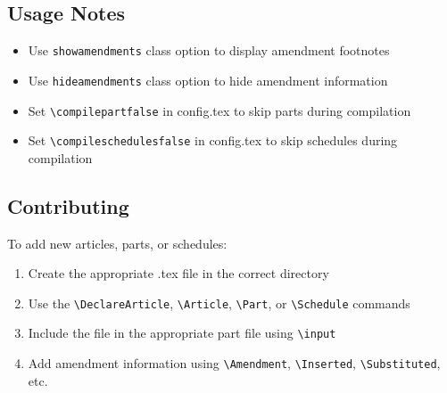 \documentclass[a4paper,12pt,showamendments]{soi}
\begin{document}
    \subsection*{Usage Notes}
    \begin{itemize}
    \item Use \texttt{showamendments} class option to display amendment footnotes
    \item Use \texttt{hideamendments} class option to hide amendment information
    \item Set \texttt{\textbackslash{}compilepartfalse} in config.tex to skip parts during compilation
    \item Set \texttt{\textbackslash{}compileschedulesfalse} in config.tex to skip schedules during compilation
    \end{itemize}
    
    \subsection*{Contributing}
    To add new articles, parts, or schedules:
    \begin{enumerate}
    \item Create the appropriate .tex file in the correct directory
    \item Use the \texttt{\textbackslash{}DeclareArticle}, \texttt{\textbackslash{}Article}, \texttt{\textbackslash{}Part}, or \texttt{\textbackslash{}Schedule} commands
    \item Include the file in the appropriate part file using \texttt{\textbackslash{}input}
    \item Add amendment information using \texttt{\textbackslash{}Amendment}, \texttt{\textbackslash{}Inserted}, \texttt{\textbackslash{}Substituted}, etc.
    \end{enumerate}
\fi
\end{document}
